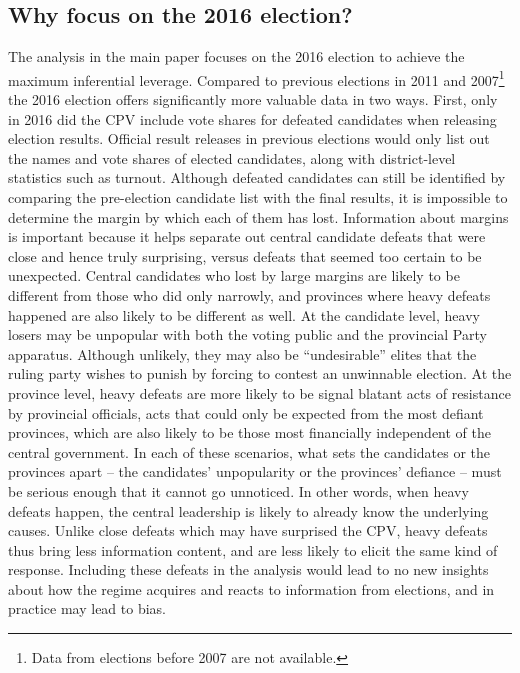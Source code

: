 \documentclass[12pt]{article}
\newcommand\fnote[1]{\footnote{\baselineskip=2\normalbaselineskip#1}}
\newcommand{\1}{\mathbbm{1}}
\begin{document}
\subsection{Why focus on the 2016 election?}

The analysis in the main paper focuses on the 2016 election to achieve the maximum inferential leverage. Compared to previous elections in 2011 and 2007\fnote{Data from elections before 2007 are not available.} the 2016 election offers significantly more valuable data in two ways. First, only in 2016 did the CPV include vote shares for defeated candidates when releasing election results. Official result releases in previous elections would only list out the names and vote shares of elected candidates, along with district-level statistics such as turnout. Although defeated candidates can still be identified by comparing the pre-election candidate list with the final results, it is impossible to determine the margin by which each of them has lost. Information about margins is important because it helps separate out central candidate defeats that were close and hence truly surprising, versus defeats that seemed too certain to be unexpected. Central candidates who lost by large margins are likely to be different from those who did only narrowly, and provinces where heavy defeats happened are also likely to be different as well. At the candidate level, heavy losers may be unpopular with both the voting public and the provincial Party apparatus. Although unlikely, they may also be ``undesirable'' elites that the ruling party wishes to punish by forcing to contest an unwinnable election. At the province level, heavy defeats are more likely to be signal blatant acts of resistance by provincial officials, acts that could only be expected from the most defiant provinces, which are also likely to be those most financially independent of the central government. In each of these scenarios, what sets the candidates or the provinces apart -- the candidates' unpopularity or the provinces' defiance -- must be serious enough that it cannot go unnoticed. In other words, when heavy defeats happen, the central leadership is likely to already know the underlying causes. Unlike close defeats which may have surprised the CPV, heavy defeats thus bring less information content, and are less likely to elicit the same kind of response. Including these defeats in the analysis would lead to no new insights about how the regime acquires and reacts to information from elections, and in practice may lead to bias.
\end{document}
